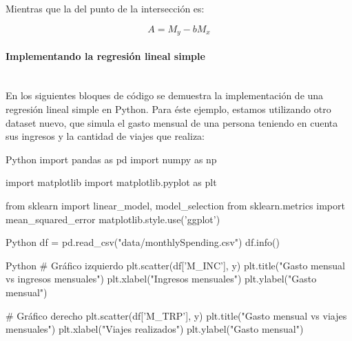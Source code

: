 Mientras que la del punto de la intersección es:

\begin{equation}
A = M_y - bM_x
\end{equation}

\paragraph{Implementando la regresión lineal simple}\mbox{}\\

En los siguientes bloques de código se demuestra la implementación de una
regresión lineal simple en Python. Para éste ejemplo, estamos utilizando otro
dataset nuevo, que simula el gasto mensual de una persona teniendo en cuenta sus
ingresos y la cantidad de viajes que realiza:

\vspace{0.25cm}
\begin{TMcode}{Python}{}{}
import pandas as pd
import numpy as np

import matplotlib
import matplotlib.pyplot as plt

from sklearn import linear_model, model_selection
from sklearn.metrics import mean_squared_error
matplotlib.style.use('ggplot')
\end{TMcode}
\vspace{0.25cm}

\begin{TMcode}{Python}{}{}
df = pd.read_csv("data/monthlySpending.csv")
df.info()
\end{TMcode}
\vspace{0.25cm}

\begin{TMcode}{Python}{}{}
# Gráfico izquierdo
plt.scatter(df['M_INC'], y)
plt.title("Gasto mensual vs ingresos mensuales")
plt.xlabel("Ingresos mensuales")
plt.ylabel("Gasto mensual")

# Gráfico derecho
plt.scatter(df['M_TRP'], y)
plt.title("Gasto mensual vs viajes mensuales")
plt.xlabel("Viajes realizados")
plt.ylabel("Gasto mensual")
\end{TMcode}
\vspace{0.25cm}

